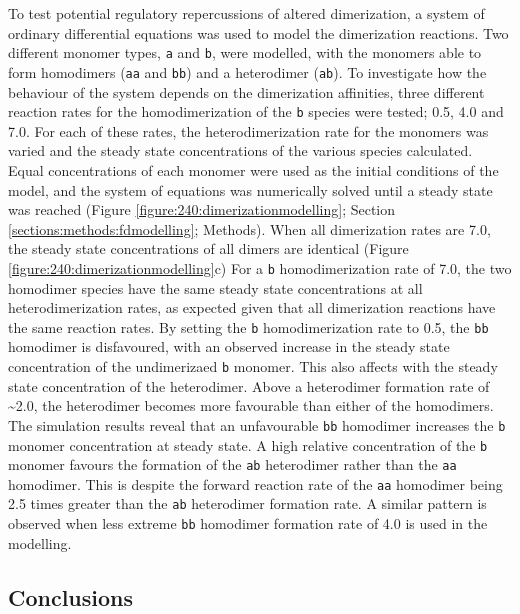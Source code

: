 \documentclass[12pt,]{book}
\begin{document}
To test potential regulatory repercussions of altered dimerization, a
system of ordinary differential equations was used to model the
dimerization reactions. Two different monomer types, \texttt{a} and
\texttt{b}, were modelled, with the monomers able to form homodimers
(\texttt{aa} and \texttt{bb}) and a heterodimer (\texttt{ab}). To
investigate how the behaviour of the system depends on the dimerization
affinities, three different reaction rates for the homodimerization of
the \texttt{b} species were tested; 0.5, 4.0 and 7.0. For each of these
rates, the heterodimerization rate for the monomers was varied and the
steady state concentrations of the various species calculated. Equal
concentrations of each monomer were used as the initial conditions of
the model, and the system of equations was numerically solved until a
steady state was reached (Figure \ref{figure:240:dimerizationmodelling};
Section \ref{sections:methods:fdmodelling}; Methods). When all
dimerization rates are 7.0, the steady state concentrations of all
dimers are identical (Figure \ref{figure:240:dimerizationmodelling}c)
For a \texttt{b} homodimerization rate of 7.0, the two homodimer species
have the same steady state concentrations at all heterodimerization
rates, as expected given that all dimerization reactions have the same
reaction rates. By setting the \texttt{b} homodimerization rate to 0.5,
the \texttt{bb} homodimer is disfavoured, with an observed increase in
the steady state concentration of the undimerizaed \texttt{b} monomer.
This also affects with the steady state concentration of the
heterodimer. Above a heterodimer formation rate of \textasciitilde{}2.0,
the heterodimer becomes more favourable than either of the homodimers.
The simulation results reveal that an unfavourable \texttt{bb} homodimer
increases the \texttt{b} monomer concentration at steady state. A high
relative concentration of the \texttt{b} monomer favours the formation
of the \texttt{ab} heterodimer rather than the \texttt{aa} homodimer.
This is despite the forward reaction rate of the \texttt{aa} homodimer
being 2.5 times greater than the \texttt{ab} heterodimer formation rate.
A similar pattern is observed when less extreme \texttt{bb} homodimer
formation rate of 4.0 is used in the modelling.

\subsection{Conclusions}\label{conclusions-3}
\end{document}
